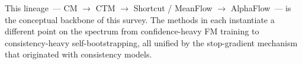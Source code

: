 This lineage\ --- CM $\to$ CTM $\to$ Shortcut / MeanFlow $\to$ AlphaFlow\ --- is the conceptual backbone of this survey. The methods in  each instantiate a different point on the spectrum from confidence-heavy FM training to consistency-heavy self-bootstrapping, all unified by the stop-gradient mechanism that originated with consistency models.

